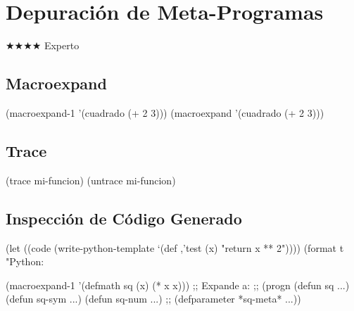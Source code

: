 \chapter{Depuración de Meta-Programas}
\label{chap:debugging-metaprograms}
{\huge$\bigstar$}{\huge$\bigstar$}{\huge$\bigstar$}{\huge$\bigstar$} Experto

\section{Macroexpand}
\begin{lispcode}
(macroexpand-1 '(cuadrado (+ 2 3)))
(macroexpand '(cuadrado (+ 2 3)))
\end{lispcode}

\section{Trace}
\begin{lispcode}
(trace mi-funcion) (untrace mi-funcion)
\end{lispcode}

\section{Inspección de Código Generado}
\begin{lispcode}
(let ((code (write-python-template `(def ,'test (x) "return x ** 2"))))
  (format t "Python:~%
\end{lispcode}

\begin{examplebox}[title=Macroexpand-1 de defmath]
\begin{lispcode}
(macroexpand-1 '(defmath sq (x) (* x x)))
;; Expande a:
;; (progn (defun sq ...) (defun sq-sym ...) (defun sq-num ...)
;;        (defparameter *sq-meta* ...))
\end{lispcode}
\end{examplebox}

